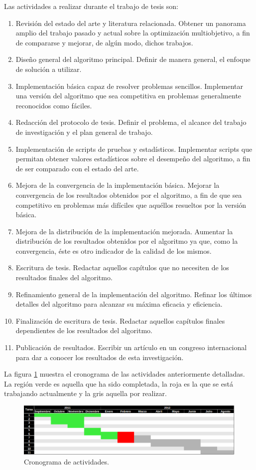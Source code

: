 \documentclass[english]{article}
\begin{document}
Las actividades a realizar durante el trabajo de tesis son:
\begin{enumerate}
\item Revisión del estado del arte y literatura relacionada. Obtener un panorama amplio del trabajo pasado y actual sobre la optimización multiobjetivo, a fin de compararse y mejorar, de algún modo, dichos trabajos.
\item Diseño general del algoritmo principal. Definir de manera general, el enfoque de solución a utilizar.
\item Implementación básica capaz de resolver problemas sencillos. Implementar una versión del algoritmo que sea competitiva en problemas generalmente reconocidos como fáciles.
\item Redacción del protocolo de tesis. Definir el problema, el alcance del trabajo de investigación y el plan general de trabajo.
\item Implementación de scripts de pruebas y estadísticos. Implementar scripts que permitan obtener valores estadísticos sobre el desempeño del algoritmo, a fin de ser comparado con el estado del arte.
\item Mejora de la convergencia de la implementación básica. Mejorar la convergencia de los resultados obtenidos por el algoritmo, a fin de que sea competitivo en problemas más difíciles que aquéllos resueltos por la versión básica.
\item Mejora de la distribución de la implementación mejorada. Aumentar la distribución de los resultados obtenidos por el algoritmo ya que, como la convergencia, éste es otro indicador de la calidad de los mismos.
\item Escritura de tesis. Redactar aquellos capítulos que no necesiten de los resultados finales del algoritmo.
\item Refinamiento general de la implementación del algoritmo. Refinar los últimos detalles del algoritmo para alcanzar su máxima eficacia y eficiencia.
\item Finalización de escritura de tesis. Redactar aquellos capítulos finales dependientes de los resultados del algoritmo.
\item Publicación de resultados. Escribir un artículo en un congreso internacional para dar a conocer los resultados de esta investigación.
\end{enumerate}

La figura \ref{fig:calendar} muestra el cronograma de las actividades anteriormente detalladas. La región verde es aquella que ha sido completada, la roja es la que se está trabajando actualmente y la gris aquella por realizar.

\begin{figure}
\includegraphics[scale=0.5]{images/cronograma}
\caption{\label{fig:calendar}Cronograma de actividades.}
\end{figure}
\end{document}
